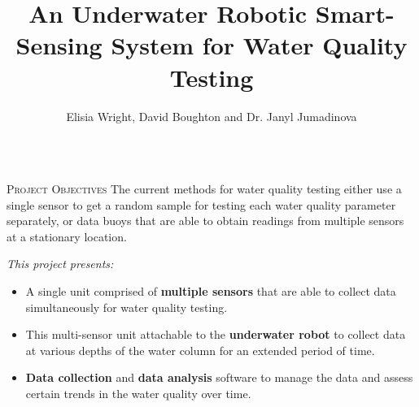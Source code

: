 \documentclass[final,t]{beamer}
\title[]{An Underwater Robotic Smart-Sensing System for Water Quality Testing }
\author[Wright]{Elisia Wright, David Boughton and Dr. Janyl Jumadinova}
\institute{Department of Computer Science, Allegheny College \\ Meadville, PA}
\begin{document}
    \begin{frame}{}
        \vspace*{-6mm}
        \begin{columns}[t]
        	\begin{column}{1\linewidth}

                \begin{alertblock}{\textsc{Project Objectives}}
                    \vspace*{3mm}
                    The current methods for water quality testing either use  a single
                    sensor to get a random sample for testing each water quality 											parameter separately, or data buoys that are able to obtain
                    readings from multiple sensors at a stationary location.
                    \vspace{3mm}

                    \emph{This project presents:}
                    \begin{itemize}
                        \item A single unit comprised of \textbf{multiple sensors} that are able to collect data simultaneously for water quality testing.
                        \item This multi-sensor unit attachable to the \textbf{underwater robot} to collect data at various depths of the water column for an extended period of time.
                        \item \textbf{Data collection} and \textbf{data analysis} software to manage the data and assess certain trends in the water quality over time.
                    \end{itemize}
                    \vspace*{6mm}
                \end{alertblock}
			\end{column}
		\end{columns}



\end{frame}
\end{document}
